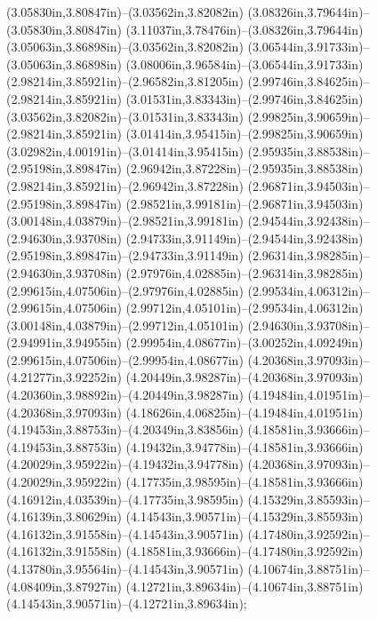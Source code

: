 (3.05830in,3.80847in)--(3.03562in,3.82082in) (3.08326in,3.79644in)--(3.05830in,3.80847in) (3.11037in,3.78476in)--(3.08326in,3.79644in) (3.05063in,3.86898in)--(3.03562in,3.82082in) (3.06544in,3.91733in)--(3.05063in,3.86898in) (3.08006in,3.96584in)--(3.06544in,3.91733in) (2.98214in,3.85921in)--(2.96582in,3.81205in) (2.99746in,3.84625in)--(2.98214in,3.85921in) (3.01531in,3.83343in)--(2.99746in,3.84625in) (3.03562in,3.82082in)--(3.01531in,3.83343in) (2.99825in,3.90659in)--(2.98214in,3.85921in) (3.01414in,3.95415in)--(2.99825in,3.90659in) (3.02982in,4.00191in)--(3.01414in,3.95415in) (2.95935in,3.88538in)--(2.95198in,3.89847in) (2.96942in,3.87228in)--(2.95935in,3.88538in) (2.98214in,3.85921in)--(2.96942in,3.87228in) (2.96871in,3.94503in)--(2.95198in,3.89847in) (2.98521in,3.99181in)--(2.96871in,3.94503in) (3.00148in,4.03879in)--(2.98521in,3.99181in) (2.94544in,3.92438in)--(2.94630in,3.93708in) (2.94733in,3.91149in)--(2.94544in,3.92438in) (2.95198in,3.89847in)--(2.94733in,3.91149in) (2.96314in,3.98285in)--(2.94630in,3.93708in) (2.97976in,4.02885in)--(2.96314in,3.98285in) (2.99615in,4.07506in)--(2.97976in,4.02885in) (2.99534in,4.06312in)--(2.99615in,4.07506in) (2.99712in,4.05101in)--(2.99534in,4.06312in) (3.00148in,4.03879in)--(2.99712in,4.05101in) (2.94630in,3.93708in)--(2.94991in,3.94955in) (2.99954in,4.08677in)--(3.00252in,4.09249in) (2.99615in,4.07506in)--(2.99954in,4.08677in) (4.20368in,3.97093in)--(4.21277in,3.92252in) (4.20449in,3.98287in)--(4.20368in,3.97093in) (4.20360in,3.98892in)--(4.20449in,3.98287in) (4.19484in,4.01951in)--(4.20368in,3.97093in) (4.18626in,4.06825in)--(4.19484in,4.01951in) (4.19453in,3.88753in)--(4.20349in,3.83856in) (4.18581in,3.93666in)--(4.19453in,3.88753in) (4.19432in,3.94778in)--(4.18581in,3.93666in) (4.20029in,3.95922in)--(4.19432in,3.94778in) (4.20368in,3.97093in)--(4.20029in,3.95922in) (4.17735in,3.98595in)--(4.18581in,3.93666in) (4.16912in,4.03539in)--(4.17735in,3.98595in) (4.15329in,3.85593in)--(4.16139in,3.80629in) (4.14543in,3.90571in)--(4.15329in,3.85593in) (4.16132in,3.91558in)--(4.14543in,3.90571in) (4.17480in,3.92592in)--(4.16132in,3.91558in) (4.18581in,3.93666in)--(4.17480in,3.92592in) (4.13780in,3.95564in)--(4.14543in,3.90571in) (4.10674in,3.88751in)--(4.08409in,3.87927in) (4.12721in,3.89634in)--(4.10674in,3.88751in) (4.14543in,3.90571in)--(4.12721in,3.89634in);
